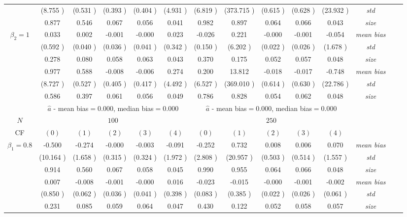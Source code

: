 \begin{table}
\begin{threeparttable}
{\begin{tabular}{|c|c|c|c|c|c|c|c|c|c|c|c|c|c|}
&(8.755 )&(0.531 )&(0.393 )&(0.404 )&(4.931 )&(6.819 )&(373.715 )&(0.615 )&(0.628 )&(23.932 )&\textit{std}\\ 
& 0.877 & 0.546 &0.067 &0.056 &0.041 &0.982& 0.897 &0.064 &0.066& 0.043 &\textit{size} \\ \midrule 
\multirow{4}{*}{$\beta_2=1$}& 0.033 & 0.002 &-0.001 &-0.000 &0.023 &-0.026& 0.221 &-0.000 &-0.001& -0.054 &\textit{mean bias} \\ 
&(0.592 )&(0.040 )&(0.036 )&(0.041 )&(0.342 )&(0.150 )&(6.202 )&(0.022 )&(0.026 )&(1.678 )&\textit{std}\\ 
& 0.278 & 0.080 &0.058 &0.063 &0.043 &0.370& 0.175 &0.052& 0.057 &0.048 &\textit{size} \\\midrule 
\multirow{4}{*}{$\beta_3=1$}& 0.977 & 0.588 &-0.008& -0.006 &0.274 &0.200 &13.812 &-0.018 &-0.017& -0.748 &\textit{mean bias} \\ 
&(8.727 )&(0.527 )&(0.405 )&(0.417 )&(4.492 )&(6.527 )&(369.010 )&(0.614 )&(0.630 )&(22.786 )&\textit{std}\\ 
& 0.586 & 0.397 &0.061 &0.056 &0.049 &0.786& 0.828& 0.054 &0.062 &0.048 &\textit{size} \\\midrule 
&\multicolumn{5}{|c|}{$\hat{a}$ - mean bias$=$0.000, median bias$=$0.000 }&\multicolumn{5}{|c|}{$\hat{a}$ - mean bias$=$0.000, median bias$=$0.000 }&\\ \hline 
\cellcolor{yellow}$N$&\multicolumn{5}{|c|}{\cellcolor{yellow}$100$}&\multicolumn{5}{|c|}{\cellcolor{yellow}$250$}&\\\hline 
CF&$(0)$&$(1)$&$(2)$&$(3)$&$(4)$& $(0)$ &$(1)$&$(2)$&$(3)$&$(4)$&\\\hline 
\multirow{4}{*}{$\beta_1=0.8$}& -0.500 & -0.274 &-0.000 &-0.003 &-0.091 &-0.252& 0.732 &0.008 &0.006& 0.070 &\textit{mean bias} \\ 
&(10.164 )&(1.658 )&(0.315 )&(0.324 )&(1.972 )&(2.808 )&(20.957 )&(0.503 )&(0.514 )&(1.557 )&\textit{std}\\ 
& 0.914 & 0.560 &0.067 &0.058 &0.045 &0.990& 0.955 &0.064 &0.066& 0.048 &\textit{size} \\\midrule 
\multirow{4}{*}{$\beta_2=1$}& 0.007 & -0.008 &-0.001 &-0.000 &0.016 &-0.023& -0.015 &-0.000 &-0.001& -0.002 &\textit{mean bias} \\ 
&(0.850 )&(0.062 )&(0.036 )&(0.041 )&(0.398 )&(0.083 )&(0.385 )&(0.022 )&(0.026 )&(0.061 )&\textit{std}\\ 
& 0.231 & 0.085 &0.059 &0.064 &0.047 &0.430& 0.122 &0.052& 0.058 &0.057 &\textit{size} \\ \midrule

\end{tabular}}
\end{threeparttable}
\end{table}
